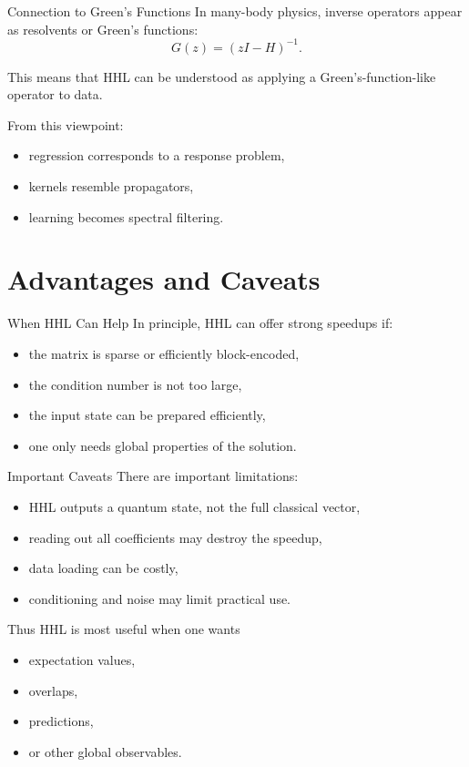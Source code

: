 \documentclass{beamer}
\begin{document}

\begin{frame}{Connection to Green's Functions}
In many-body physics, inverse operators appear as resolvents or Green's functions:
\[
G(z) = (zI - H)^{-1}.
\]

This means that HHL can be understood as applying a Green's-function-like operator to data.

From this viewpoint:
\begin{itemize}
\item regression corresponds to a response problem,
\item kernels resemble propagators,
\item learning becomes spectral filtering.
\end{itemize}
\end{frame}

\section{Advantages and Caveats}

\begin{frame}{When HHL Can Help}
In principle, HHL can offer strong speedups if:
\begin{itemize}
\item the matrix is sparse or efficiently block-encoded,
\item the condition number is not too large,
\item the input state can be prepared efficiently,
\item one only needs global properties of the solution.
\end{itemize}
\end{frame}


\begin{frame}{Important Caveats}
There are important limitations:
\begin{itemize}
\item HHL outputs a quantum state, not the full classical vector,
\item reading out all coefficients may destroy the speedup,
\item data loading can be costly,
\item conditioning and noise may limit practical use.
\end{itemize}

Thus HHL is most useful when one wants
\begin{itemize}
\item expectation values,
\item overlaps,
\item predictions,
\item or other global observables.
\end{itemize}
\end{frame}
\end{document}
